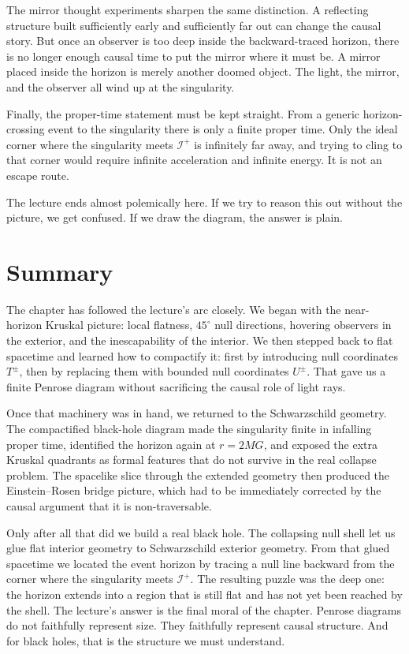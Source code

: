 The mirror thought experiments sharpen the same distinction. A reflecting structure built sufficiently early and sufficiently far out can change the causal story. But once an observer is too deep inside the backward-traced horizon, there is no longer enough causal time to put the mirror where it must be. A mirror placed inside the horizon is merely another doomed object. The light, the mirror, and the observer all wind up at the singularity.

Finally, the proper-time statement must be kept straight. From a generic horizon-crossing event to the singularity there is only a finite proper time. Only the ideal corner where the singularity meets \(\mathcal{I}^+\) is infinitely far away, and trying to cling to that corner would require infinite acceleration and infinite energy. It is not an escape route.

The lecture ends almost polemically here. If we try to reason this out without the picture, we get confused. If we draw the diagram, the answer is plain.

\section{Summary}

The chapter has followed the lecture's arc closely. We began with the near-horizon Kruskal picture: local flatness, \(45^\circ\) null directions, hovering observers in the exterior, and the inescapability of the interior. We then stepped back to flat spacetime and learned how to compactify it: first by introducing null coordinates \(T^\pm\), then by replacing them with bounded null coordinates \(U^\pm\). That gave us a finite Penrose diagram without sacrificing the causal role of light rays.

Once that machinery was in hand, we returned to the Schwarzschild geometry. The compactified black-hole diagram made the singularity finite in infalling proper time, identified the horizon again at \(r=2MG\), and exposed the extra Kruskal quadrants as formal features that do not survive in the real collapse problem. The spacelike slice through the extended geometry then produced the Einstein--Rosen bridge picture, which had to be immediately corrected by the causal argument that it is non-traversable.

Only after all that did we build a real black hole. The collapsing null shell let us glue flat interior geometry to Schwarzschild exterior geometry. From that glued spacetime we located the event horizon by tracing a null line backward from the corner where the singularity meets \(\mathcal{I}^+\). The resulting puzzle was the deep one: the horizon extends into a region that is still flat and has not yet been reached by the shell. The lecture's answer is the final moral of the chapter. Penrose diagrams do not faithfully represent size. They faithfully represent causal structure. And for black holes, that is the structure we must understand.